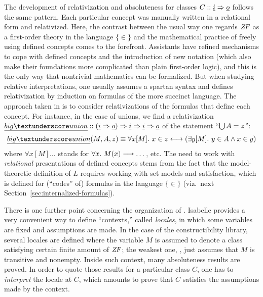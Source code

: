 The development of relativization and absoluteness for classes $C::
\isa{i} \fun \isa{o}$ follows the same pattern. Each particular
concept was manually written in a relational form and relativized.
Here, the contrast between the usual way one regards $\mathit{ZF}$ as a
first-order theory in the language $\{\in \}$ and the mathematical
practice of freely using defined concepts comes to the
forefront. Assistants have refined mechanisms to cope with defined
concepts and the introduction of new notation (which also make their foundations more complicated
than plain first-order logic), and this is the only way that nontrivial
mathematics can be formalized. But when studying relative interpretations, one
usually assumes a spartan syntax and defines relativization by
induction on formulas of the more succinct language. The approach
taken in  is to consider relativizations of
the formulas that define each concept. For instance,
in the case of unions, we find a relativization
$\isa{big{\uscore}union}:: (\isa{i} \fun \isa{o}) \fun \isa{i}
\fun \isa{i} \fun \isa{o}$ of the statement
“$\mathop{\textstyle\bigcup} A = z$”:
\[
 \isa{big{\uscore}union}(M,A,z) \equiv \forall x[M].\ x \in z
 \longleftrightarrow (\exists y[M].\ y \in A \land x \in y)
\]
where $\forall x[M]\dots$ stands for $\forall x.\ M(x)\longrightarrow \dots$,
etc. The need to work with \emph{relational} presentations of defined
concepts stems from the fact that the model-theoretic definition of
$L$ requires working with set models and satisfaction, which is
defined for (“codes” of) formulas in the language $\{\in \}$
(viz.\ next Section~\ref{sec:internalized-formulas}).

There is one further point concerning the organization of
. Isabelle provides a very convenient way to
define “contexts,” called \emph{locales}, in which some variables are
fixed and assumptions are made. In the case of the constructibility
library, several locales are defined where the variable $M$ is assumed to
denote a class satisfying certain finite amount of $\mathit{ZF}$; the weakest
one,  \cite[Sect.~3]{2020arXiv200109715G}, just
assumes that $M$ is transitive and nonempty. Inside such context, many
absoluteness results are proved. In order to quote those results for a
particular class $C$, one has to \emph{interpret} the locale at
$C$, which amounts to prove that $C$ satisfies the assumptions made by
the context.

